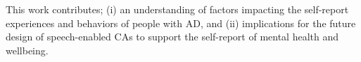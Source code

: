     This work contributes; (i) an understanding of factors impacting the self-report experiences and behaviors of people with \ac{AD}, and (ii) implications for the future design of speech-enabled \ac{CA}s to support the self-report of mental health and wellbeing.
    
